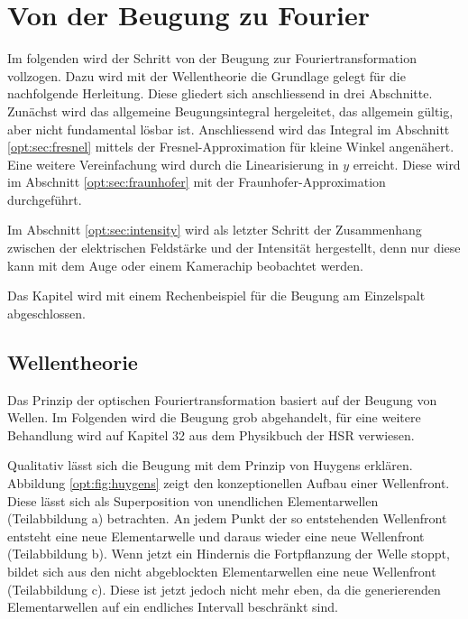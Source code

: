 %
%
%
%
\section{Von der Beugung zu Fourier\label{opt:section:grundlagen}}

Im folgenden wird der Schritt von der Beugung zur Fouriertransformation vollzogen.
Dazu wird mit der Wellentheorie die Grundlage gelegt für die nachfolgende Herleitung.
Diese gliedert sich anschliessend in drei Abschnitte. 
Zunächst wird das allgemeine Beugungsintegral hergeleitet, das allgemein gültig, aber nicht fundamental lösbar ist.
Anschliessend wird das Integral im Abschnitt \ref{opt:sec:fresnel} mittels der Fresnel-Approximation für kleine Winkel angenähert.
Eine weitere Vereinfachung wird durch die Linearisierung in $y$ erreicht. 
Diese wird im Abschnitt \ref{opt:sec:fraunhofer} mit der Fraunhofer-Approximation durchgeführt.

Im Abschnitt \ref{opt:sec:intensity} wird als letzter Schritt der Zusammenhang zwischen der elektrischen Feldstärke und der Intensität hergestellt, denn nur diese kann mit dem Auge oder einem Kamerachip beobachtet werden.

Das Kapitel wird mit einem Rechenbeispiel für die Beugung am Einzelspalt abgeschlossen. 


\subsection{Wellentheorie}
\label{opt:subsection:huygens}
Das Prinzip der optischen Fouriertransformation basiert auf der Beugung von Wellen.
Im Folgenden wird die Beugung grob abgehandelt, für eine weitere Behandlung wird auf Kapitel 32 aus dem Physikbuch der HSR \cite{opt:HSR:Physik2} verwiesen.

Qualitativ lässt sich die Beugung mit dem Prinzip von Huygens erklären. 
Abbildung \ref{opt:fig:huygens} zeigt den konzeptionellen Aufbau einer Wellenfront.
Diese lässt sich als Superposition von unendlichen Elementarwellen (Teilabbildung a) betrachten.
An jedem Punkt der so entstehenden Wellenfront entsteht eine neue Elementarwelle und daraus wieder eine neue Wellenfront (Teilabbildung b).
Wenn jetzt ein Hindernis die Fortpflanzung der Welle stoppt, bildet sich aus den nicht abgeblockten Elementarwellen eine neue Wellenfront (Teilabbildung c).
Diese ist jetzt jedoch nicht mehr eben, da die generierenden Elementarwellen auf ein endliches Intervall beschränkt sind.

